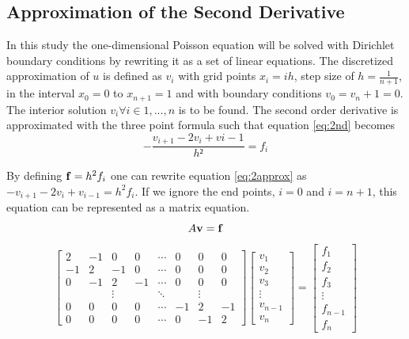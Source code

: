 \documentclass[10pt, a4paper]{amsart}
\begin{document}
\subsection{Approximation of the Second Derivative}
In this study the one-dimensional Poisson equation will be solved with Dirichlet boundary conditions by rewriting it as a set of linear equations. The discretized approximation of $u$ is defined as $v_i$ with grid points $x_i=ih$, step size of $h=\frac{1}{n+1}$, in the interval $x_0=0$ to $x_{n+1}=1$ and with boundary conditions $v_0=v_n+1=0$. The interior solution $v_i \forall i \in {1,...,n}$ is to be found. The second order derivative is approximated with the three point formula such that equation \ref{eq:2nd} becomes
\begin{equation}
-\frac{v_{i+1}-2v_i+v{i-1}}{h²}=f_i \label{eq:2approx}
\end{equation}

By defining $\vb{f}=h^2f_i$ one can rewrite equation
\ref{eq:2approx} as $-v_{i+1}-2v_i+v_{i-1}=h^2f_i$. If we ignore the
end points, $i=0$ and $i=n+1$, this equation can be represented as a
matrix equation.
\begin{equation}
\label{eq:matrix}
A\vb{v}=\vb{f}
\end{equation}
\begin{equation}
\begin{bmatrix}
2 & -1 & 0 & 0 & \cdots & 0 & 0 & 0 \\
-1 & 2 & -1 & 0 & \cdots & 0 & 0 & 0 \\
0 & -1 & 2 & -1 & \cdots & 0 & 0 & 0 \\ 
& & \vdots &  & \ddots &  & \vdots & \\
0 & 0 & 0 & 0 & \cdots & -1 & 2 & -1 \\
0 & 0 & 0 & 0 & \cdots & 0 & -1 & 2 
\end{bmatrix}
\begin{bmatrix}
v_1 \\
v_2 \\
v_3 \\
\vdots \\
v_{n-1} \\
v_n
\end{bmatrix}=
\begin{bmatrix}
f_1 \\
f_2 \\
f_3 \\
\vdots \\
f_{n-1} \\
f_n
\end{bmatrix}
\end{equation}
\end{document}
